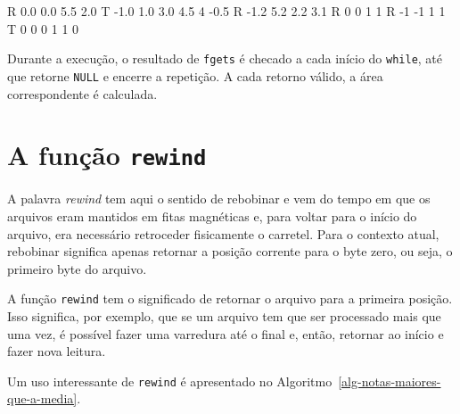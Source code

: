 \documentclass[
  11pt,
  a4paper,
]{scrbook}
\newenvironment{Shaded}{\begin{snugshade}}{\end{snugshade}}
\newcommand{\NormalTok}[1]{#1}
\begin{document}
\begin{Shaded}
\begin{Highlighting}[]
\NormalTok{R 0.0 0.0 5.5 2.0}
\NormalTok{T {-}1.0 1.0 3.0 4.5 4 {-}0.5}
\NormalTok{R {-}1.2 5.2 2.2 3.1}
\NormalTok{R 0 0 1 1}
\NormalTok{R {-}1 {-}1 1 1}
\NormalTok{T 0 0 0 1 1 0}
\end{Highlighting}
\end{Shaded}

Durante a execução, o resultado de \texttt{fgets} é checado a cada
início do \texttt{while}, até que retorne \texttt{NULL} e encerre a
repetição. A cada retorno válido, a área correspondente é calculada.

\section{\texorpdfstring{A função
\texttt{rewind}}{A função rewind}}\label{a-funuxe7uxe3o-rewind}

A palavra \emph{rewind} tem aqui o sentido de rebobinar e vem do tempo
em que os arquivos eram mantidos em fitas magnéticas e, para voltar para
o início do arquivo, era necessário retroceder fisicamente o carretel.
Para o contexto atual, rebobinar significa apenas retornar a posição
corrente para o byte zero, ou seja, o primeiro byte do arquivo.

A função \texttt{rewind} tem o significado de retornar o arquivo para a
primeira posição. Isso significa, por exemplo, que se um arquivo tem que
ser processado mais que uma vez, é possível fazer uma varredura até o
final e, então, retornar ao início e fazer nova leitura.

Um uso interessante de \texttt{rewind} é apresentado no
Algoritmo~\ref{alg-notas-maiores-que-a-media}.
\end{document}
